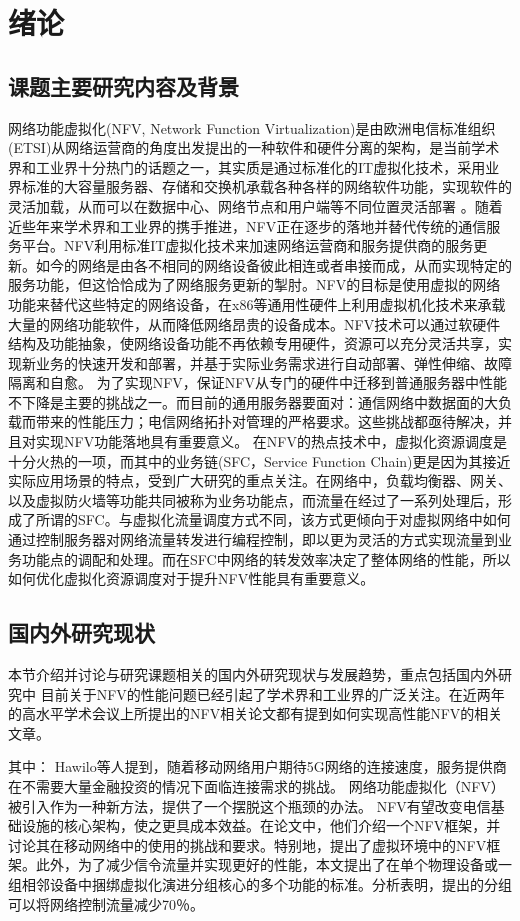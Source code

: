 \chapter{绪论}
\label{chap: Introduction}


\section{课题主要研究内容及背景}
网络功能虚拟化(NFV, Network Function Virtualization)是由欧洲电信标准组织(ETSI)从网络运营商的角度出发提出的一种软件和硬件分离的架构，是当前学术界和工业界十分热门的话题之一，其实质是通过标准化的IT虚拟化技术，采用业界标准的大容量服务器、存储和交换机承载各种各样的网络软件功能，实现软件的灵活加载，从而可以在数据中心、网络节点和用户端等不同位置灵活部署 。随着近些年来学术界和工业界的携手推进，NFV正在逐步的落地并替代传统的通信服务平台。NFV利用标准IT虚拟化技术来加速网络运营商和服务提供商的服务更新。如今的网络是由各不相同的网络设备彼此相连或者串接而成，从而实现特定的服务功能，但这恰恰成为了网络服务更新的掣肘。NFV的目标是使用虚拟的网络功能来替代这些特定的网络设备，在x86等通用性硬件上利用虚拟机化技术来承载大量的网络功能软件，从而降低网络昂贵的设备成本。NFV技术可以通过软硬件结构及功能抽象，使网络设备功能不再依赖专用硬件，资源可以充分灵活共享，实现新业务的快速开发和部署，并基于实际业务需求进行自动部署、弹性伸缩、故障隔离和自愈。
为了实现NFV，保证NFV从专门的硬件中迁移到普通服务器中性能不下降是主要的挑战之一。而目前的通用服务器要面对：通信网络中数据面的大负载而带来的性能压力；电信网络拓扑对管理的严格要求。这些挑战都亟待解决，并且对实现NFV功能落地具有重要意义。
在NFV的热点技术中，虚拟化资源调度是十分火热的一项，而其中的业务链(SFC，Service Function Chain)更是因为其接近实际应用场景的特点，受到广大研究的重点关注。在网络中，负载均衡器、网关、以及虚拟防火墙等功能共同被称为业务功能点，而流量在经过了一系列处理后，形成了所谓的SFC。与虚拟化流量调度方式不同，该方式更倾向于对虚拟网络中如何通过控制服务器对网络流量转发进行编程控制，即以更为灵活的方式实现流量到业务功能点的调配和处理。而在SFC中网络的转发效率决定了整体网络的性能，所以如何优化虚拟化资源调度对于提升NFV性能具有重要意义。
\section{国内外研究现状}
本节介绍并讨论与研究课题相关的国内外研究现状与发展趋势，重点包括国内外研究中
目前关于NFV的性能问题已经引起了学术界和工业界的广泛关注。在近两年的高水平学术会议上所提出的NFV相关论文都有提到如何实现高性能NFV的相关文章。

其中：
Hawilo等人提到，随着移动网络用户期待5G网络的连接速度，服务提供商在不需要大量金融投资的情况下面临连接需求的挑战。 网络功能虚拟化（NFV）被引入作为一种新方法，提供了一个摆脱这个瓶颈的办法。 NFV有望改变电信基础设施的核心架构，使之更具成本效益。在论文中，他们介绍一个NFV框架，并讨论其在移动网络中的使用的挑战和要求。特别地，提出了虚拟环境中的NFV框架。此外，为了减少信令流量并实现更好的性能，本文提出了在单个物理设备或一组相邻设备中捆绑虚拟化演进分组核心的多个功能的标准。分析表明，提出的分组可以将网络控制流量减少70％。

